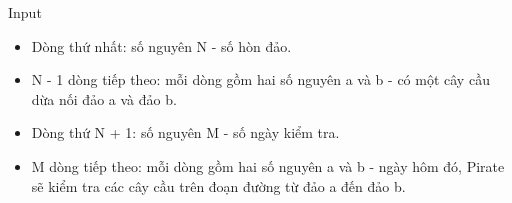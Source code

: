 Input
\begin{itemize}
	\item     Dòng thứ nhất: số nguyên N - số hòn đảo.   
	\item     N - 1 dòng tiếp theo: mỗi dòng gồm hai số nguyên a và b - có một cây cầu dừa nối đảo a và đảo b.   
	\item     Dòng thứ N + 1: số nguyên M - số ngày kiểm tra.   
	\item     M dòng tiếp theo: mỗi dòng gồm hai số nguyên a và b - ngày hôm đó, Pirate sẽ kiểm tra các cây cầu trên đoạn đường từ đảo a đến đảo b.   
\end{itemize}